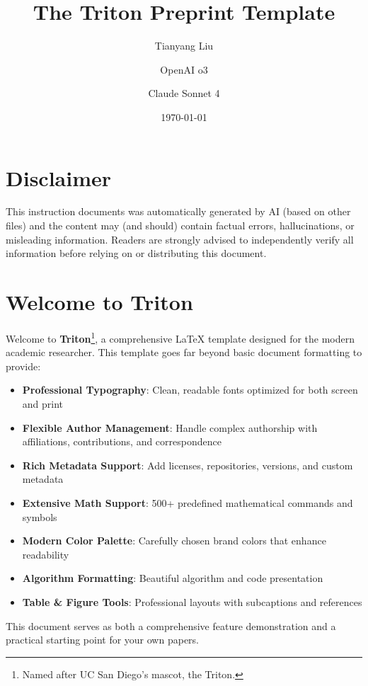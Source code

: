 \documentclass{triton}
\title{The Triton Preprint Template}
\author[1]{Tianyang Liu}
\author[2,*]{OpenAI o3}
\author[3,*]{Claude Sonnet 4}
\affiliation[1]{University of California San Diego}
\affiliation[2]{OpenAI}
\affiliation[3]{Anthropic}
\date{\today}
\begin{document}
\maketitle

\section*{Disclaimer}

\textcolor{ucsdgold}{This instruction documents was automatically generated by AI (based on other files) and the content may (and should) contain factual errors, hallucinations, or misleading information. Readers are strongly advised to independently verify all information before relying on or distributing this document.}

\section{Welcome to Triton}

Welcome to \textbf{Triton}\footnote{Named after UC San Diego's mascot, the Triton.}, a comprehensive \LaTeX{} template designed for the modern academic researcher. This template goes far beyond basic document formatting to provide:

\begin{itemize}[leftmargin=15pt]
    \item \textbf{Professional Typography}: Clean, readable fonts optimized for both screen and print
    \item \textbf{Flexible Author Management}: Handle complex authorship with affiliations, contributions, and correspondence
    \item \textbf{Rich Metadata Support}: Add licenses, repositories, versions, and custom metadata
    \item \textbf{Extensive Math Support}: 500+ predefined mathematical commands and symbols
    \item \textbf{Modern Color Palette}: Carefully chosen brand colors that enhance readability
    \item \textbf{Algorithm Formatting}: Beautiful algorithm and code presentation
    \item \textbf{Table \& Figure Tools}: Professional layouts with subcaptions and references
\end{itemize}

This document serves as both a comprehensive feature demonstration and a practical starting point for your own papers.
\end{document}
